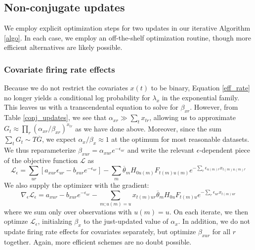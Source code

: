 \documentclass[10pt,letterpaper]{article}
\begin{document}
\subsection{Non-conjugate updates}
\label{non-conj}
We employ explicit optimization steps for two updates in our iterative Algorithm \ref{algo}. In each case, we employ an off-the-shelf optimization routine, though more efficient alternatives are likely possible.

\subsubsection{Covariate firing rate effects}
\label{beta_x}
Because we do not restrict the covariates $x(t)$ to be binary, Equation \ref{eff_rate} no longer yields a conditional log probability for $\lambda_x$ in the exponential family. This leaves us with a transcendental equation to solve for $\beta_{xr}$. However, from Table \ref{conj_updates}, we see that $\alpha_{xr} \gg \sum_t x_{tr}$, allowing us to approximate $G_t \approx \prod_r (\alpha_{xr}/\beta_{xr})^{x_{tr}}$ as we have done above. Moreover, since the sum $\sum_t G_t \sim T\overline{G}$, we expect $\alpha_x / \beta_x \approx 1$ at the optimum for most reasonable datasets. We thus reparameterize $\beta_{xur} = \alpha_{xur}e^{-\epsilon_{ur}}$ and write the relevant $\epsilon$-dependent piece of the objective function $\mathcal{L}$ as
\begin{equation}
    \mathcal{L}_\epsilon = \sum_{ur} \left[a_{xur}\epsilon_{ur} - b_{xur}e^{-\epsilon_{ur}} \right] - \sum_m \overline{\theta}_m H_{0u(m)} F_{t(m)u(m)}
    e^{-\sum_r \epsilon_{u(m)r} x_{t(m)u(m)r}}
\end{equation}
We also supply the optimizer with the gradient:
\begin{equation}
    \nabla_\epsilon \mathcal{L}_\epsilon = a_{xur} - b_{xur}e^{-\epsilon_{ur}}  - \sum_{m; u(m) = u} x_{t(m)ur} \overline{\theta}_m H_{0u} F_{t(m)u}
    e^{-\sum_r \epsilon_{ur} x_{t(m)ur}}
\end{equation}
where we sum only over observations with $u(m) = u$. On each iterate, we then optimze $\mathcal{L}_\epsilon$, initialzing $\beta_x$ to the just-updated value of $\alpha_x$. In addition, we do not update firing rate effects for covariates separately, but optimize $\beta_{xur}$ for all $r$ together. Again, more efficient schemes are no doubt possible.
\end{document}
